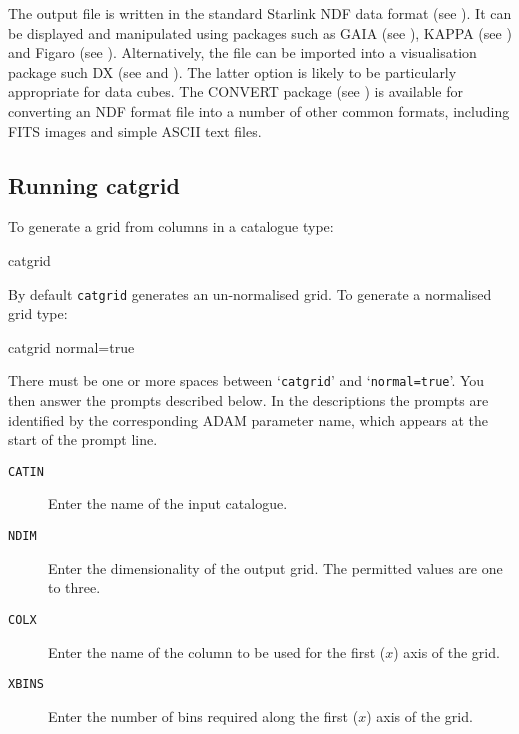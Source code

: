 \documentclass[twoside,11pt]{starlink}
\begin{document}
The output file is written in the standard Starlink NDF data format
(see \cite{SUN33}).  It can be displayed and
manipulated using packages such as
GAIA (see \cite{SUN214}),
KAPPA (see \cite{SUN95}) and
Figaro (see \cite{SUN86}).  Alternatively, the file
can be imported into a visualisation package such DX (see
\cite{SUN203} and \cite{SC2}).
The latter option is likely to be particularly appropriate for data
cubes.  The CONVERT package (see \cite{SUN55})
is available for converting an NDF format file into a number of other
common formats, including FITS images and simple ASCII text files.

\subsection{Running catgrid}

To generate a grid from columns in a catalogue type:

\begin{terminalv}
catgrid
\end{terminalv}

By default \texttt{catgrid} generates an un-normalised grid.  To generate
a normalised grid type:

\begin{terminalv}
catgrid  normal=true
\end{terminalv}

There must be one or more spaces between `\texttt{catgrid}' and `\texttt{normal=true}'.  You then answer the prompts described below.  In the
descriptions the prompts are identified by the corresponding ADAM
parameter name, which appears at the start of the prompt line.

\begin{description}

  \item[ \texttt{CATIN} ] Enter the name of the input catalogue.

  \item[ \texttt{NDIM} ] Enter the dimensionality of the output grid.  The
   permitted values are one to three.

  \item[ \texttt{COLX} ] Enter the name of the column to be used for the
   first ($x$\/) axis of the grid.

  \item[ \texttt{XBINS} ] Enter the number of bins required along the first
   ($x$\/) axis of the grid.

\end{description}
\end{document}
